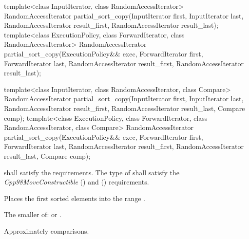 %
\begin{itemdecl}
template<class InputIterator, class RandomAccessIterator>
  RandomAccessIterator
    partial_sort_copy(InputIterator first, InputIterator last,
                      RandomAccessIterator result_first,
                      RandomAccessIterator result_last);
template<class ExecutionPolicy, class ForwardIterator, class RandomAccessIterator>
  RandomAccessIterator
    partial_sort_copy(ExecutionPolicy&& exec,
                      ForwardIterator first, ForwardIterator last,
                      RandomAccessIterator result_first,
                      RandomAccessIterator result_last);

template<class InputIterator, class RandomAccessIterator,
         class Compare>
  RandomAccessIterator
    partial_sort_copy(InputIterator first, InputIterator last,
                      RandomAccessIterator result_first,
                      RandomAccessIterator result_last,
                      Compare comp);
template<class ExecutionPolicy, class ForwardIterator, class RandomAccessIterator,
         class Compare>
  RandomAccessIterator
    partial_sort_copy(ExecutionPolicy&& exec,
                      ForwardIterator first, ForwardIterator last,
                      RandomAccessIterator result_first,
                      RandomAccessIterator result_last,
                      Compare comp);
\end{itemdecl}

\begin{itemdescr}
\pnum
\requires
{} shall satisfy the
 requirements. The type
of  shall satisfy the
\textit{Cpp98MoveConstructible} () and
 () requirements.

\pnum
\effects
Places the first
sorted elements into the range
.

\pnum
\returns
The smaller of:
 or
.

\pnum
\complexity
Approximately
comparisons.
\end{itemdescr}

